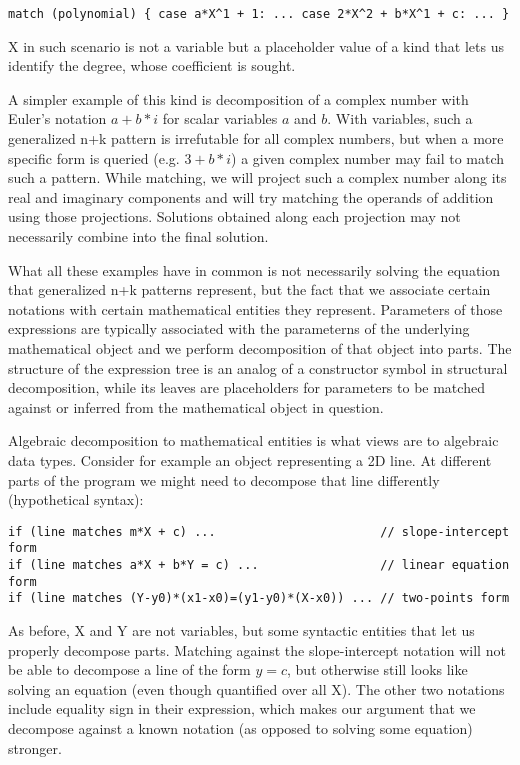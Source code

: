 \begin{lstlisting}[keepspaces,columns=flexible]
match (polynomial) { case a*X^1 + 1: ... case 2*X^2 + b*X^1 + c: ... }
\end{lstlisting} 

X in such scenario is not a variable but a placeholder value of a kind that lets 
us identify the degree, whose coefficient is sought. 

A simpler example of this kind is decomposition of a complex number with Euler's 
notation $a+b*i$ for scalar variables $a$ and $b$. With variables, such a 
generalized n+k pattern is irrefutable for all complex numbers, but when a more 
specific form is queried (e.g. $3+b*i$) a given complex number may fail to match 
such a pattern. While matching, we will project such a complex number along its 
real and imaginary components and will try matching the operands of addition 
using those projections. Solutions obtained along each projection may not 
necessarily combine into the final solution.

What all these examples have in common is not necessarily solving the equation 
that generalized n+k patterns represent, but the fact that we associate certain 
notations with certain mathematical entities they represent. Parameters of 
those expressions are typically associated with the parameterns of the 
underlying mathematical object and we perform decomposition of that object into 
parts. The structure of the expression tree is an analog of a constructor symbol in 
structural decomposition, while its leaves are placeholders for parameters to be 
matched against or inferred from the mathematical object in question.

Algebraic decomposition to mathematical entities is what views are to algebraic 
data types. Consider for example an object representing a 2D line. At different 
parts of the program we might need to decompose that line differently (hypothetical syntax):

\begin{lstlisting}[keepspaces,columns=flexible]
if (line matches m*X + c) ...                       // slope-intercept form
if (line matches a*X + b*Y = c) ...                 // linear equation form
if (line matches (Y-y0)*(x1-x0)=(y1-y0)*(X-x0)) ... // two-points form
\end{lstlisting}

As before, X and Y are not variables, but some syntactic entities that let us 
properly decompose parts. Matching against the slope-intercept notation will not 
be able to decompose a line of the form $y=c$, but otherwise still looks like 
solving an equation (even though quantified over all X). The other two notations 
include equality sign in their expression, which makes our argument that we 
decompose against a known notation (as opposed to solving some equation) 
stronger.

